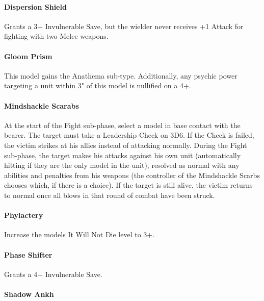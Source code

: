  \label{Technoarcana}

\paragraph*{Dispersion Shield} \label{Dispersion Shield}

Grants a 3+ Invulnerable Save, but the wielder never receives +1 Attack for fighting with two Melee weapons.

\paragraph*{Gloom Prism} \label{Gloom Prism}

This model gains the Anathema sub-type. Additionally, any psychic power targeting a unit within 3" of this model is nullified on a 4+. \\

\paragraph*{Mindshackle Scarabs} \label{Mindshackle Scarabs}

At the start of the Fight sub-phase, select a model in base contact with the bearer. The target must take a Leadership Check on 3D6. If the Check is failed, the victim strikes at his allies instead of attacking normally. During the Fight sub-phase, the target makes his attacks against his own unit (automatically hitting if they are the only model in the unit), resolved as normal with any abilities and penalties from his weapons (the controller of the Mindshackle Scarbs chooses which, if there is a choice). If the target is still alive, the victim returns to normal once all blows in that round of combat have been struck.

\paragraph*{Phylactery} \label{Phylactery}

Increase the models It Will Not Die level to 3+.

\paragraph*{Phase Shifter} \label{Phase Shifter}

Grants a 4+ Invulnerable Save.

\paragraph*{Shadow Ankh} \label{Shadow Ankh}

